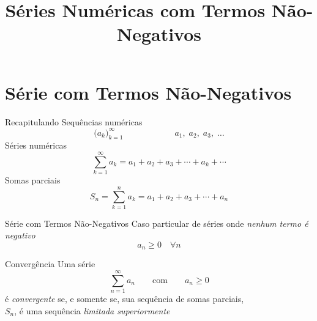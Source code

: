 \documentclass[fleqn,utf8,aspectratio=169,12pt]{beamer}
\title{Séries Numéricas com Termos Não-Negativos}
\begin{document}
\addtitle

\section{Série com Termos Não-Negativos}

\begin{frame}{Recapitulando}
  Sequências numéricas
  \[
    \big( a_k \big)_{k=1}^\infty \qquad\qquad\qquad a_1,\; a_2,\; a_3,\; \dots
  \]
  \pause
  Séries numéricas
  \[
    \sum_{k=1}^\infty a_k = a_1 + a_2 + a_3 + \cdots + a_k + \cdots
  \]
  \pause
  Somas parciais
  \[
    S_n = \sum_{k=1}^n a_k = a_1 + a_2 + a_3 + \cdots + a_n
  \]
\end{frame}

\begin{frame}{Série com Termos Não-Negativos}
  Caso particular de séries onde \emph{nenhum termo é negativo}
  \pause
  \[
   a_n \geq 0 \quad \forall n
  \]
\end{frame}

\begin{frame}{Convergência}
  Uma série
  \[
    \sum_{n=1}^\infty a_n \qquad \text{com} \qquad a_n\geq 0
  \]
  \pause
  é \emph{convergente}
  \pause
  se, e somente se, sua sequência de somas parciais, \\
  \pause
  $S_n$, é uma sequência \emph{limitada superiormente}
\end{frame}

\end{document}
